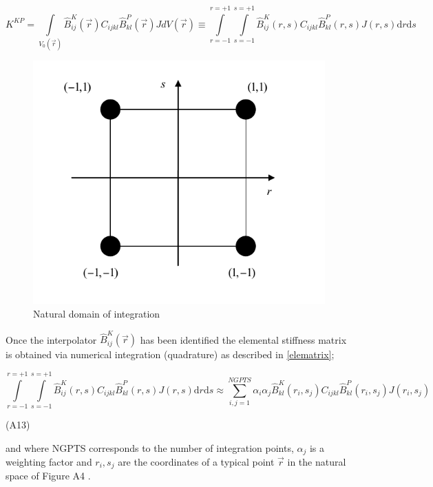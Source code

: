 \begin{equation}
K^{KP}=\int\limits_{V_0(\vec{r})} \hat{B}_{ij}^K(\vec{r}) C_{ijkl} \hat{B}_{kl}^P(\vec{r})J dV(\vec{r})\equiv \int\limits_{r=-1}^{r=+1}\int\limits_{s=-1}^{s=+1} \hat{B}_{ij}^K(r,s) C_{ijkl} \hat{B}_{kl}^P(r,s)J(r,s) \mathrm{d}r\mathrm{d}s
\label{elematrix}
\end{equation}



\begin{figure}[h]
\centering
\includegraphics[width=12cm]{img/figure3.pdf}
\caption{Natural domain of integration}
\label{fig:Nat domain}
\end{figure}	 		
 

Once the interpolator $\hat{B}_{ij}^K(\vec{r})$ has been identified the elemental stiffness matrix is obtained via numerical integration (quadrature) as described in \eqref{elematrix};

\begin{equation}
\int\limits_{r=-1}^{r=+1}\int\limits_{s=-1}^{s=+1} \hat{B}_{ij}^K(r,s) C_{ijkl} \hat{B}_{kl}^P(r,s)J(r,s) \mathrm{d}r\mathrm{d}s\approx \sum_{i,j=1}^{NGPTS} \alpha_i \alpha_j \hat{B}_{kl}^K(r_i,s_j)C_{ijkl} \hat{B}_{kl}^P(r_i,s_j) J(r_i,s_j)
\label{eleinetgration}
\end{equation}

	 													(A13)

and where NGPTS corresponds to the number of integration points, $\alpha_j$ is a weighting factor and $r_i,s_j$   are the coordinates of a typical point $\vec{r}$ in the natural space of Figure A4 .

